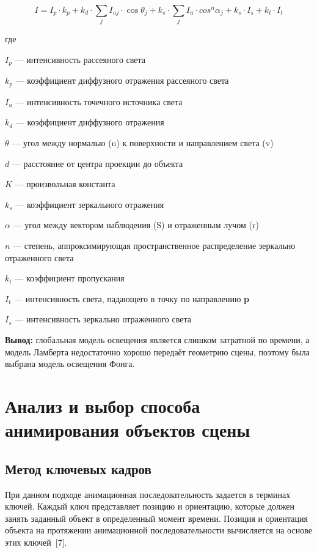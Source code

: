 \begin{equation}
	I = I_{p} \cdot k_{p} + k_{d} \cdot \sum_{j} I_{uj} \cdot \cos\theta_{j} + k_{s} \cdot \sum_{j} I_{u} \cdot cos^{n} \alpha_{j} + k_{s} \cdot I_{s} + k_{t} \cdot I_{t}
\end{equation}

где

	$I_{p}$ --- интенсивность рассеяного света
	
	$k_{p}$ --- коэффициент диффузного отражения рассеяного света
	
	$I_{u}$ --- интенсивность точечного источника света
	
	$k_{d}$ --- коэффициент диффузного отражения
	
	$\theta$ --- угол между нормалью (n) к поверхности и направлением света (v)
	
	$d$ --- расстояние от центра проекции до объекта
	
	$K$ --- произвольная константа
	
	$k_{s}$ --- коэффициент зеркального отражения
	
	$\alpha$ --- угол между вектором наблюдения (S) и отраженным лучом (r)
	
	$n$ --- степень, аппроксимирующая пространственное распределение зеркально отраженного света
	
	$k_{t}$ --- коэффициент пропускания
	
	$I_{t}$ --- интенсивность света, падающего в точку по направлению \textbf{p}
	
	$I_{s}$ --- интенсивность зеркально отраженного света

	\textbf{Вывод:} глобальная модель освещения является слишком затратной по времени, а модель Ламберта недостаточно хорошо передаёт геометрию сцены, поэтому была выбрана модель освещения Фонга.
	
	\section{Анализ и выбор способа анимирования объектов сцены}
	
	\subsection*{Метод ключевых кадров}
	
	При данном подходе анимационная последовательность задается в терминах ключей. Каждый ключ представляет позицию и ориентацию, которые должен занять заданный объект в определенный момент времени. Позиция и ориентация объекта на протяжении анимационной последовательности вычисляется на основе этих ключей~[7].
	
